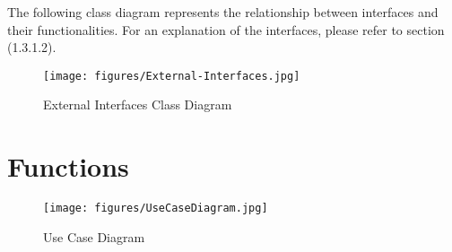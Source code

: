 \documentclass[listof=nochaptergap]{report}
\begin{document}
The following class diagram represents the relationship between interfaces and their functionalities. For an explanation of the interfaces, please refer to section (1.3.1.2).

\begin{center}
        \begin{figure}[H]
            \centering
            \texttt{[image: figures/External-Interfaces.jpg]}
            \caption{External Interfaces Class Diagram}
            \label{fig:figure1}
        \end{figure}
    \end{center}

\section{Functions}
    \begin{center}
        \begin{figure}[H]
            \centering
            \texttt{[image: figures/UseCaseDiagram.jpg]}
            \caption{Use Case Diagram}
            \label{fig:figure1}
        \end{figure}
    \end{center}
\end{document}
